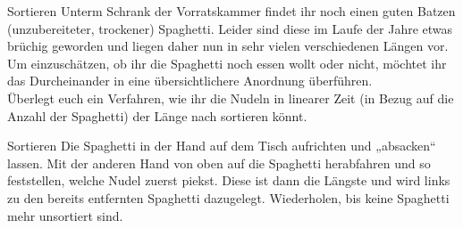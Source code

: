 \begin{frame}{Sortieren}
	Unterm Schrank der Vorratskammer findet ihr noch einen guten Batzen (unzubereiteter, trockener) Spaghetti. Leider sind diese im Laufe der Jahre etwas brüchig geworden und liegen daher nun in sehr vielen verschiedenen Längen vor. Um einzuschätzen, ob ihr die Spaghetti noch essen wollt oder nicht, möchtet ihr das Durcheinander in eine übersichtlichere Anordnung überführen. \\
	\medskip
	Überlegt euch ein Verfahren, wie ihr die Nudeln in linearer Zeit (in Bezug auf die Anzahl der Spaghetti) der Länge nach sortieren könnt.
\end{frame}

\begin{frame}{Sortieren}
	\solutionheading 
	Die Spaghetti in der Hand auf dem Tisch aufrichten und „absacken“ lassen. Mit der anderen Hand von oben auf die Spaghetti herabfahren und so feststellen, welche Nudel zuerst piekst. Diese ist dann die Längste und wird links zu den bereits entfernten Spaghetti dazugelegt. Wiederholen, bis keine Spaghetti mehr unsortiert sind.
\end{frame}


